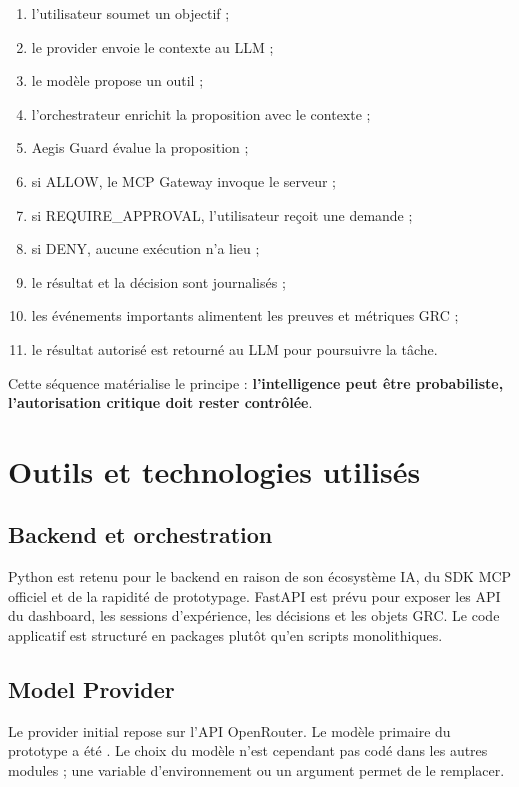\begin{enumerate}
    \item l'utilisateur soumet un objectif ;
    \item le provider envoie le contexte au LLM ;
    \item le modèle propose un outil ;
    \item l'orchestrateur enrichit la proposition avec le contexte ;
    \item Aegis Guard évalue la proposition ;
    \item si ALLOW, le MCP Gateway invoque le serveur ;
    \item si REQUIRE\_APPROVAL, l'utilisateur reçoit une demande ;
    \item si DENY, aucune exécution n'a lieu ;
    \item le résultat et la décision sont journalisés ;
    \item les événements importants alimentent les preuves et métriques GRC ;
    \item le résultat autorisé est retourné au LLM pour poursuivre la tâche.
\end{enumerate}

Cette séquence matérialise le principe : \textbf{l'intelligence peut être probabiliste, l'autorisation critique doit rester contrôlée}.

\section{Outils et technologies utilisés}

\subsection{Backend et orchestration}

Python est retenu pour le backend en raison de son écosystème IA, du SDK MCP officiel et de la rapidité de prototypage. FastAPI est prévu pour exposer les API du dashboard, les sessions d'expérience, les décisions et les objets GRC. Le code applicatif est structuré en packages plutôt qu'en scripts monolithiques.

\subsection{Model Provider}

Le provider initial repose sur l'API OpenRouter. Le modèle primaire du prototype a été . Le choix du modèle n'est cependant pas codé dans les autres modules ; une variable d'environnement ou un argument permet de le remplacer.

